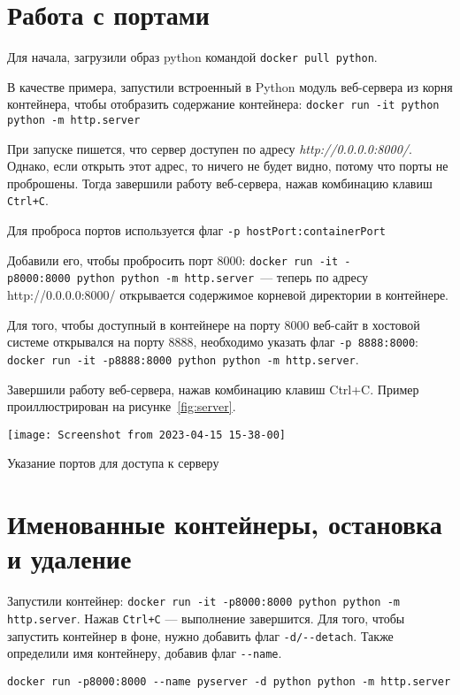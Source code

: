 \section{Работа с портами}
Для начала, загрузили образ python командой \texttt{docker pull python}.\par
В качестве примера, запустили встроенный в Python модуль веб-сервера
из корня контейнера, чтобы отобразить содержание контейнера:
\texttt{docker run -it python python -m http.server}\par
При запуске пишется, что сервер доступен по адресу
\textit{http://0.0.0.0:8000/}. Однако, если открыть этот адрес,
то ничего не будет видно, потому что порты не проброшены.
Тогда завершили работу веб-сервера, нажав комбинацию клавиш
\texttt{Ctrl+C}.\par
Для проброса портов используется флаг \texttt{-p~hostPort:containerPort}\par
Добавили его, чтобы пробросить порт 8000:
\texttt{docker~run~-it~-p8000:8000~python~python~-m~http.server}~--- теперь
по адресу http://0.0.0.0:8000/ открывается содержимое корневой директории
в контейнере.\par
Для того, чтобы доступный в контейнере на порту 8000 веб-сайт
в хостовой системе открывался на порту 8888, необходимо указать флаг
\texttt{-p~8888:8000}:
\texttt{docker~run~-it~-p8888:8000~python~python~-m~http.server}.\par
Завершили работу веб-сервера, нажав комбинацию клавиш Ctrl+C.
Пример проиллюстрирован на рисунке~\ref{fig:server}.

\begin{image}
	\texttt{[image: Screenshot from 2023-04-15 15-38-00]}
	\caption{Указание портов для доступа к серверу}
	\label{fig:server}
\end{image}

\section{Именованные контейнеры, остановка и удаление}
Запустили контейнер:
\texttt{docker run -it -p8000:8000 python python -m http.server}.
Нажав \texttt{Ctrl+C} --- выполнение завершится.
Для того, чтобы запустить контейнер в фоне, нужно добавить флаг
\verb|-d/--detach|.
Также определили имя контейнеру, добавив флаг \verb|--name|.

\begin{verbatim}
docker run -p8000:8000 --name pyserver -d python python -m http.server
\end{verbatim}

